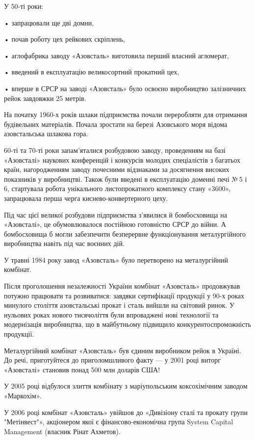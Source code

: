 У 50-ті роки:

• запрацювали ще дві домни,

• почав роботу цех рейкових скріплень,

• аглофабрика заводу «Азовсталь» виготовила перший власний агломерат,

• введений в експлуатацію великосортний прокатний цех,

• вперше в СРСР на заводі «Азовсталь» було освоєно виробництво залізничних
рейок завдовжки 25 метрів.

На початку 1960-х років шлаки підприємства почали переробляти для отримання
будівельних матеріалів. Почала зростати на березі Азовського моря відома
азовстальська шлакова гора.

60-ті та 70-ті роки запам'яталися розбудовою заводу, проведенням на базі
«Азовсталі» наукових конференцій і конкурсів молодих спеціалістів з багатьох
країн, нагородженням заводу почесними відзнаками за досягнення високих
показників у виробництві. Також були введені в експлуатацію доменні печі № 5 і
6, стартувала робота унікального листопрокатного комплексу стану «3600»,
запрацювала перша черга киснево-конвертерного цеху.

Під час цієї великої розбудови підприємства з'явилися й бомбосховища на
«Азовсталі», це обумовлювалося постійною готовністю СРСР до війни. А
бомбосховища б могли забезпечити безперервне функціонування металургійного
виробництва навіть під час воєнних дій.

У травні 1984 року завод «Азовсталь» було перетворено на металургійний
комбінат.

Після проголошення незалежності України комбінат «Азовсталь» продовжував
потужно працювати та розвиватися: завдяки сертифікації продукції у 90-х роках
минулого століття азовстальські прокат і сталь вийшли на світовий ринок. У
нульових роках нового тисячоліття були впроваджені нові технології та
модернізація виробництва, що в майбутньому підвищило конкурентоспроможність
продукції.

Металургійний комбінат «Азовсталь» був єдиним виробником рейок в Україні. До
речі, приготуйтеся до приголомшливого факту — у 2001 році виторг «Азовсталі»
становив понад 500 млн доларів США!

У 2005 році відбулося злиття комбінату з маріупольським коксохімічним заводом
«Маркохім».

У 2006 році комбінат «Азовсталь» увійшов до «Дивізіону сталі та прокату групи
"Метінвест"», акціонером якої є фінансово-економічна група System Capital
Management (власник Рінат Ахметов).

